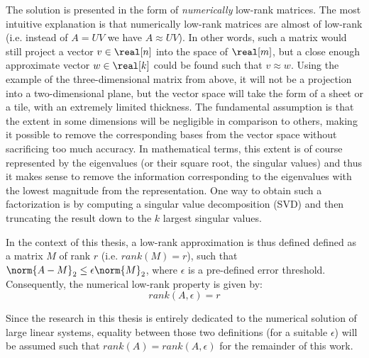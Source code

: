The solution is presented in the form of \textit{numerically} low-rank matrices. The most intuitive explanation is that numerically low-rank matrices are almost of low-rank (i.e. instead of $A=UV$ we have $A \approx UV$). In other words, such a matrix would still project a vector $v \in \real[n]$ into the space of $\real[m]$, but a close enough approximate vector $w \in \real[k]$ could be found such that $v \approx w$. Using the example of the three-dimensional matrix from above, it will not be a projection into a two-dimensional plane, but the vector space will take the form of a sheet or a tile, with an extremely limited thickness. The fundamental assumption is that the extent in some dimensions will be negligible in comparison to others, making it possible to remove the corresponding bases from the vector space without sacrificing too much accuracy. In mathematical terms, this extent is of course represented by the eigenvalues (or their square root, the singular values) and thus it makes sense to remove the information corresponding to the eigenvalues with the lowest magnitude from the representation. One way to obtain such a factorization is by computing a singular value decomposition (SVD) and then truncating the result down to the $k$ largest singular values.

In the context of this thesis, a low-rank approximation is thus defined defined as a matrix $M$ of rank $r$ (i.e. $rank(M)=r$), such that $\norm{A-M}_2 \leq \epsilon\norm{M}_2$, where $\epsilon$ is a pre-defined error threshold. Consequently, the numerical low-rank property is given by:
\begin{equation}
    rank(A,\epsilon) = r
\end{equation}

\noindent Since the research in this thesis is entirely dedicated to the numerical solution of large linear systems, equality between those two definitions (for a suitable $\epsilon$) will be assumed such that $rank(A) = rank(A,\epsilon)$ for the remainder of this work.